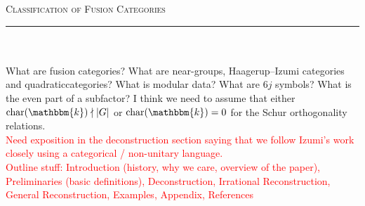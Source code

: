 



\thispagestyle{fancy}

\begin{center}
\LARGE\scshape Classification of Fusion Categories\noindent\\[-\linespacing]
\rule{0.75\linewidth}{1pt}
\end{center}
\noindent\\[-0.75\linespacing]

\noindent\\ What are fusion categories? What are near-groups, Haagerup--Izumi categories and quadratic\linebreak categories? What is modular data? What are $6j$ symbols? What is the even part of a subfactor? I think we need to assume that either $\textup{char}(\mathbbm{k}) \nmid \abs{G}$ or $\textup{char}(\mathbbm{k}) = 0$ for the Schur orthogonality relations.\\

\noindent\textcolor{red}{Need exposition in the deconstruction section saying that we follow Izumi's work closely using a categorical / non-unitary language.}\\

\noindent\textcolor{red}{Outline stuff: Introduction (history, why we care, overview of the paper), Preliminaries (basic definitions), Deconstruction, Irrational Reconstruction, General Reconstruction, Examples, Appendix, References}\\

